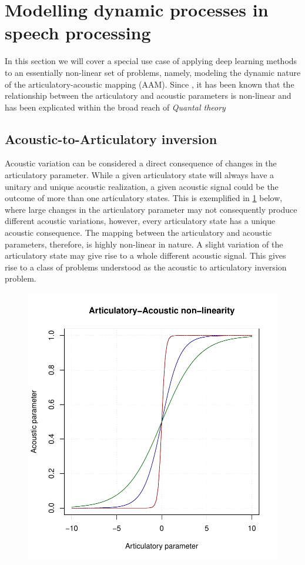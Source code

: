 \documentclass{article}[12pt]
\begin{document}
\section{Modelling dynamic processes in speech processing}
In this section we will cover a special use case of applying deep learning methods to an essentially non-linear set of problems, namely, modeling the dynamic nature of the articulatory-acoustic mapping (AAM). Since \cite{stevens1968}, it has been known that the relationship between the articulatory and acoustic parameters is non-linear and has been explicated within the broad reach of \emph{Quantal theory} \citep{stevens1968}
\subsection{Acoustic-to-Articulatory inversion}
Acoustic variation can be considered a direct consequence of changes in the articulatory parameter. While a given articulatory state will always have a unitary and unique acoustic realization, a given acoustic signal could be the outcome of more than one articulatory states. This is exemplified in \ref{Fig.1} below, where large changes in the articulatory parameter may not consequently produce different acoustic variations, however, every articulatory state has a unique acoustic consequence. The mapping between the articulatory and acoustic parameters, therefore, is highly non-linear in nature. A slight variation of the articulatory state may give rise to a whole different acoustic signal. This gives rise to a class of problems understood as the acoustic to articulatory inversion problem. 

\begin{figure}[h]
\includegraphics[scale=0.80]{sigmoid.pdf}
\label{Fig.1}
\end{figure}
\end{document}
